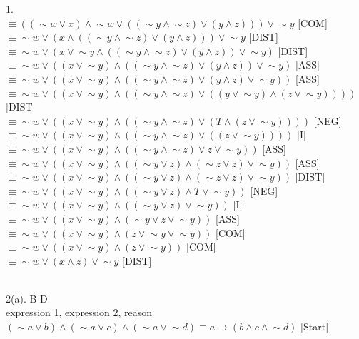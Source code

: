 \documentclass[a4paper, 20pt]{article}
\def\lnot{\mathop{\sim}}
\def\implies{\mathop{\rightarrow}}
\begin{document}
\begin{question}{1.}
\\ $\equiv ((\lnot w \lor x ) \land \lnot w \lor((\lnot y \land \lnot z)\lor(y \land z)) ) \lor \lnot y$ [COM]
\\ $\equiv \lnot w \lor( x \land((\lnot y \land \lnot z)\lor(y \land z)) ) \lor \lnot y$ [DIST]
\\ $\equiv \lnot w \lor(x \lor \lnot y \land((\lnot y \land \lnot z)\lor(y \land z)) \lor \lnot y ) $ [DIST]
\\ $\equiv \lnot w \lor((x \lor \lnot y) \land((\lnot y \land \lnot z)\lor(y \land z)) \lor \lnot y ) $ [ASS]
\\ $\equiv \lnot w \lor((x \lor \lnot y) \land((\lnot y \land \lnot z)\lor(y \land z) \lor \lnot y )) $ [ASS]
\\ $\equiv \lnot w \lor((x \lor \lnot y) \land((\lnot y \land \lnot z)\lor((y \lor \lnot y) \land (z \lor \lnot y )))) $ [DIST]
\\ $\equiv \lnot w \lor((x \lor \lnot y) \land((\lnot y \land \lnot z)\lor(T \land (z \lor \lnot y )))) $ [NEG]
\\ $\equiv \lnot w \lor((x \lor \lnot y) \land((\lnot y \land \lnot z)\lor((z \lor \lnot y )))) $ [I]
\\ $\equiv \lnot w \lor((x \lor \lnot y) \land((\lnot y \land \lnot z)\lor z \lor \lnot y )) $ [ASS]
\\ $\equiv \lnot w \lor((x \lor \lnot y) \land((\lnot y \lor z) \land (\lnot z \lor z) \lor \lnot y )) $ [ASS]
\\ $\equiv \lnot w \lor((x \lor \lnot y) \land((\lnot y \lor z) \land (\lnot z \lor z) \lor \lnot y )) $ [DIST]
\\ $\equiv \lnot w \lor((x \lor \lnot y) \land((\lnot y \lor z) \land T \lor \lnot y )) $ [NEG]
\\ $\equiv \lnot w \lor((x \lor \lnot y) \land((\lnot y \lor z)  \lor \lnot y )) $ [I]
\\ $\equiv \lnot w \lor((x \lor \lnot y) \land(\lnot y \lor z  \lor \lnot y )) $ [ASS]
\\ $\equiv \lnot w \lor((x \lor \lnot y) \land( z \lor \lnot y \lor \lnot y )) $ [COM]
\\ $\equiv \lnot w \lor((x \lor \lnot y) \land( z \lor \lnot y )) $ [COM]
\\ $\equiv \lnot w \lor(x  \land z)\lor \lnot y $ [DIST]
\\ \boxed{}
\newpage

\\2(a). B \equiv D
\\ expression 1, expression 2, reason
\\$(\lnot a \lor b)\land(\lnot a \lor c)\land(\lnot a \lor \lnot d) \equiv a \implies (b \land c \land \lnot d)$ [Start]

\end{question}
\end{document}
